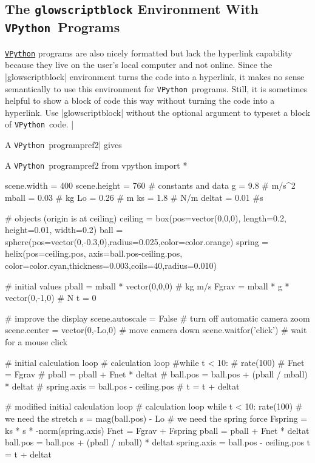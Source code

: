 \documentclass{article}
\newcommand*{\VPython}{\texttt{VPython}}
\begin{document}
\subsection{The \texttt{glowscriptblock} Environment With \VPython\ Programs}
\href{https://vpython.org}{\VPython} programs are also nicely formatted but lack the hyperlink capability
because they live on the user's local computer and not online. Since the |glowscriptblock| environment 
turns the code into a hyperlink, it makes no sense semantically to use this environment for \VPython\ 
programs. Still, it is sometimes helpful to show a block of code this way without turning the code into 
a hyperlink. Use |glowscriptblock| without the optional argument to typeset a block of \VPython\ code. 
|\begin{glowscriptblock}{A \VPython\ program}{pref2}| gives

\begin{glowscriptblock}{A \VPython\ program}{pref2}
from vpython import *

scene.width = 400
scene.height = 760
# constants and data
g = 9.8       # m/s^2
mball = 0.03  # kg
Lo = 0.26     # m
ks = 1.8      # N/m
deltat = 0.01 #s 

# objects (origin is at ceiling)
ceiling = box(pos=vector(0,0,0), length=0.2, height=0.01, width=0.2)
ball = sphere(pos=vector(0,-0.3,0),radius=0.025,color=color.orange)
spring = helix(pos=ceiling.pos, axis=ball.pos-ceiling.pos,
         color=color.cyan,thickness=0.003,coils=40,radius=0.010)

# initial values
pball = mball * vector(0,0,0)      # kg m/s
Fgrav = mball * g * vector(0,-1,0) # N
t = 0

# improve the display
scene.autoscale = False        # turn off automatic camera zoom
scene.center = vector(0,-Lo,0) # move camera down
scene.waitfor('click')         # wait for a mouse click

# initial calculation loop
# calculation loop
#while t < 10:
#    rate(100)
#    Fnet = Fgrav
#    pball = pball + Fnet * deltat
#    ball.pos = ball.pos + (pball / mball) * deltat
#    spring.axis = ball.pos - ceiling.pos
#    t = t + deltat
    
# modified initial calculation loop
# calculation loop
while t < 10:
    rate(100)
    # we need the stretch
    s = mag(ball.pos) - Lo
    # we need the spring force
    Fspring = ks * s * -norm(spring.axis)
    Fnet = Fgrav + Fspring
    pball = pball + Fnet * deltat
    ball.pos = ball.pos + (pball / mball) * deltat
    spring.axis = ball.pos - ceiling.pos
    t = t + deltat
\end{glowscriptblock}


\end{glowscriptblock}
\end{document}

